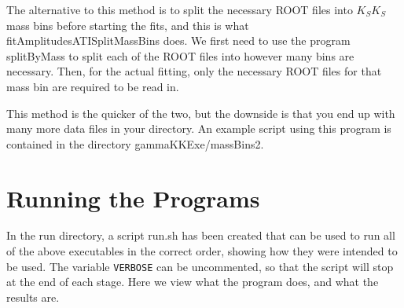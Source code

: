 \documentclass[11pt]{article}
\begin{document}
\begin{itemize}
    The alternative to this method is to split the necessary ROOT
    files into $K_{S} K_{S}$ mass bins before starting the fits, and
    this is what fitAmplitudesATISplitMassBins does. We first need to
    use the program splitByMass to split each of the ROOT files into
    however many bins are necessary. Then, for the actual fitting,
    only the necessary ROOT files for that mass bin are required to be
    read in.

    This method is the quicker of the two, but the downside is that
    you end up with many more data files in your directory. An example
    script using this program is contained in the directory
    gammaKKExe/massBins2.

\end{itemize}

\section{Running the Programs}

In the run directory, a script run.sh has been created that can be
used to run all of the above executables in the correct order, showing
how they were intended to be used. The variable {\tt{VERBOSE}} can be
uncommented, so that the script will stop at the end of each stage.
Here we view what the program does, and what the results are.
\end{document}
